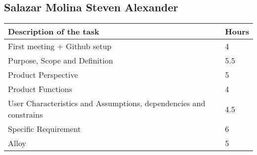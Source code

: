 \subsection{Salazar Molina Steven Alexander}
\begin{center}
\renewcommand{\arraystretch}{1.5}

\begin{tabular}{ |m{7cm}|m{2cm}| } 
 \hline
 \textbf{Description of the task}  & \textbf{Hours} \\
 \hline
 First meeting + Github setup & 4 \\
 \hline
 Purpose, Scope and Definition & 5.5 \\
 \hline
 Product Perspective & 5 \\ 
 \hline
 Product Functions & 4 \\ 
 \hline 
 User Characteristics and Assumptions, dependencies and constrains & 4.5 \\  
 \hline
 Specific Requirement & 6 \\
 \hline
 Alloy &  5\\
 \hline
\end{tabular}
\end{center}